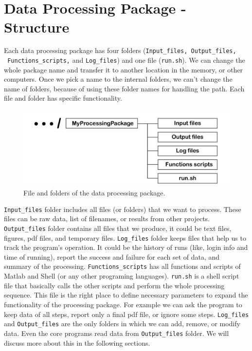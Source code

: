 \section{Data Processing Package - Structure}

Each data processing package has four folders (\texttt{Input\_files, Output\_files,} \\ \texttt{ Functions\_scripts,} and \texttt{Log\_files}) and one file (\texttt{run.sh}). We can change the whole package name and transfer it to another location in the memory, or other computers. Once we pick a name to the internal folders, we can't change the name of folders, because of using these folder names for handling the path. Each file and folder has specific functionality.

\begin{figure} [ht]
\centering
\includegraphics[scale=0.8]{figures/pdf/Figure02.pdf} 
\caption{File and folders of the data processing package.}
\label{fig:structure}
\end{figure}

\noindent
\texttt{Input\_files} folder includes all files (or folders) that we want to process. These files can be raw data, list of filenames, or results from other projects. \texttt{Output\_files} folder contains all files that we produce, it could be text files, figures, pdf files, and temporary files. \texttt{Log\_files} folder keeps files that help us to track the program's operation. It could be the history of runs (like, login info and time of running), report the success and failure for each set of data, and summary of the processing.  \texttt{Functions\_scripts} has all functions and scripts of Matlab and Shell (or any other programing languages).  \texttt{run.sh} is a shell script file that basically calls the other scripts and perform the whole processing sequence. This file is the right place to define necessary parameters to expand the functionality of the processing package. For example we can ask the program to keep data of all steps, report only a final pdf file, or ignore some steps.  \texttt{Log\_files} and  \texttt{Output\_files} are the only folders in which we can add, remove, or modify data. Even the core programs read data from  \texttt{Output\_files} folder. We will discuss more about this in the following sections.


